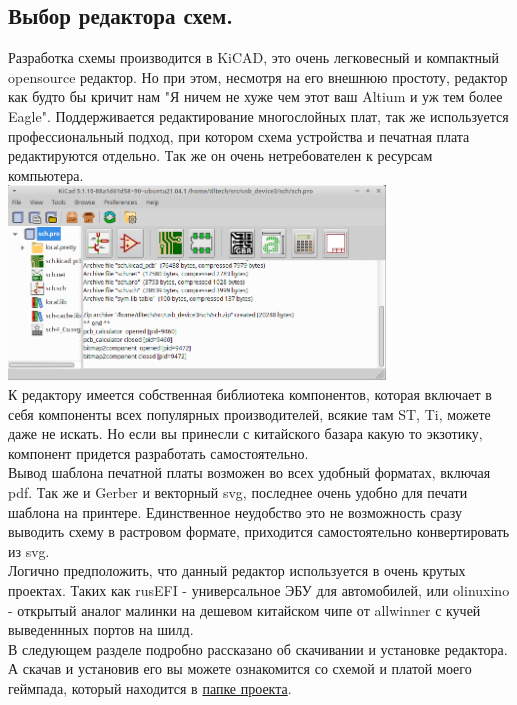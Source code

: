 \documentclass[12pt,a4paper]{article}
\begin{document}
\subsection{Выбор редактора схем.}
    Разработка схемы производится в KiCAD, это очень легковесный и компактный
    opensource редактор. Но при этом, несмотря на его внешнюю простоту, редактор
    как будто бы кричит нам "Я ничем не хуже чем этот ваш Altium и уж тем более
    Eagle". Поддерживается редактирование многослойных плат, так же используется
    профессиональный подход, при котором схема устройства и печатная плата
    редактируются отдельно. Так же он очень нетребователен к ресурсам
    компьютера.\\
\includegraphics[width=10cm]{kicad1.png}\\
    К редактору имеется собственная библиотека компонентов, которая включает в
    себя компоненты всех популярных производителей, всякие там ST, Ti, можете
    даже не искать. Но если вы принесли
    с китайского базара какую то экзотику, компонент придется разработать
    самостоятельно.\\
    Вывод шаблона печатной платы возможен во всех удобный форматах, включая pdf.
    Так же и Gerber и векторный svg, последнее очень удобно для печати шаблона
    на принтере. Единственное неудобство это не возможность сразу выводить схему
    в растровом формате, приходится самостоятельно конвертировать из svg.\\
    Логично предположить, что данный редактор используется в очень крутых
    проектах. Таких как rusEFI - универсальное ЭБУ для автомобилей, или
    olinuxino - открытый аналог малинки на дешевом китайском чипе от allwinner
    с кучей выведеннных портов на шилд.\\
    В следующем разделе подробно рассказано об скачивании и установке редактора.
    А скачав и установив его вы можете ознакомится со схемой и платой моего
    геймпада, который находится в
    \href{https://github.com/dltech/usb_device3/tree/main/sch}{папке проекта}.\\
\end{document}
